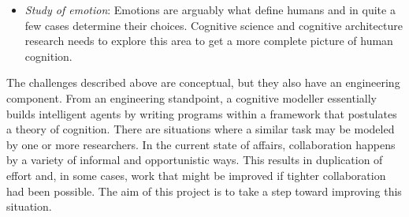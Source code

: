 \begin{itemize}
\item \emph{Study of emotion}: Emotions are arguably what define
  humans and in quite a few cases determine their choices.  Cognitive
  science and cognitive architecture research needs to explore this
  area to get a more complete picture of human cognition.



\end{itemize}


The challenges described above are conceptual, but they also have an
engineering component.  From an engineering standpoint, a cognitive
modeller essentially builds intelligent agents by writing programs
within a framework that postulates a theory of cognition. There are
situations where a similar task may be modeled by one or more
researchers.  In the current state of affairs, collaboration happens
by a variety of informal and opportunistic ways.  This results in
duplication of effort and, in some cases, work that might be improved
if tighter collaboration had been possible.  The aim of this project
is to take a step toward improving this situation.

